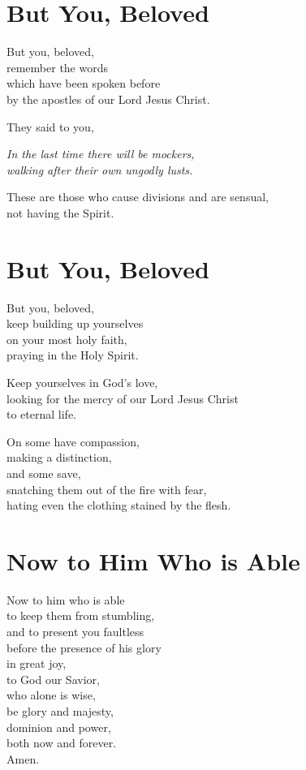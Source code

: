 \documentclass[twoside, openany, 12pt]{extbook}
\newcommand{\tab}[1][0.5cm]{\hspace*{#1}}
\begin{document}
\newpage\section{But You, Beloved}

But you, beloved,
\\
remember the words
\\
\tab{}
which have been spoken before
\\
\tab{}
\tab{}
by the apostles of our Lord Jesus Christ.

They said to you,

{\itshape{}
  \tab{}
  In the last time there will be mockers,
  \\
  \tab{}
  walking after their own ungodly lusts.
}

These are those who cause divisions and are sensual,
\\
not having the Spirit.

\newpage\section{But You, Beloved}

But you, beloved,
\\
keep building up yourselves
\\
\tab{}
on your most holy faith,
\\
praying in the Holy Spirit.

Keep yourselves in God's love,
\\
looking for the mercy of our Lord Jesus Christ
\\
\tab{}
to eternal life.

On some have compassion,
\\
\tab{}
making a distinction,
\\
and some save,
\\
\tab{}
snatching them out of the fire with fear,
\\
\tab{}
hating even the clothing stained by the flesh.

\newpage\section{Now to Him Who is Able}

Now to him who is able
\\
\tab{}
to keep them from stumbling,
\\
\tab{}
and to present you faultless
\\
\tab{}
\tab{}
before the presence of his glory
\\
\tab{}
\tab{}
\tab{}
in great joy,
\\
to God our Savior,
\\
\tab{}
who alone is wise,
\\
\tab{}
\tab{}
be glory and majesty,
\\
\tab{}
\tab{}
dominion and power,
\\
\tab{}
\tab{}
both now and forever.
\\
Amen.
\end{document}
